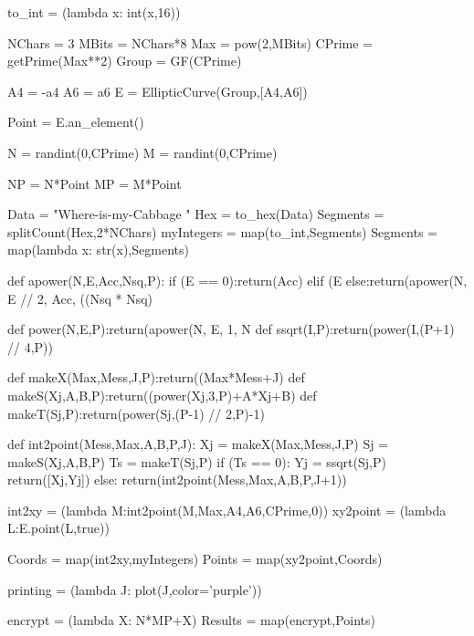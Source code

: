 \documentclass[a0,portrait]{a0poster}
\begin{document}
\begin{multicols}{2}
\begin{sagesilent}
  to_int = (lambda x: int(x,16))

\end{sagesilent}

\begin{sagesilent}
  NChars = 3
  MBits = NChars*8
  Max = pow(2,MBits)
  CPrime = getPrime(Max**2)
  Group = GF(CPrime)

  A4 = -a4
  A6 =  a6
  E = EllipticCurve(Group,[A4,A6])

  Point = E.an_element()

  N = randint(0,CPrime)
  M = randint(0,CPrime)

  NP = N*Point
  MP = M*Point

  Data = "Where-is-my-Cabbage  "
  Hex = to_hex(Data)
  Segments = splitCount(Hex,2*NChars)
  myIntegers = map(to_int,Segments)
  Segments = map(lambda x: str(x),Segments)
\end{sagesilent}

\begin{sagesilent}
def apower(N,E,Acc,Nsq,P):
    if (E == 0):return(Acc)
    elif (E %
    else:return(apower(N, E // 2, Acc, ((Nsq * Nsq) %
    
def power(N,E,P):return(apower(N, E, 1, N %
def ssqrt(I,P):return(power(I,(P+1) // 4,P))
\end{sagesilent}


\begin{sagesilent}
def makeX(Max,Mess,J,P):return((Max*Mess+J) %
def makeS(Xj,A,B,P):return((power(Xj,3,P)+A*Xj+B)%
def makeT(Sj,P):return(power(Sj,(P-1) // 2,P)-1)
  
def int2point(Mess,Max,A,B,P,J):
    Xj = makeX(Max,Mess,J,P)
    Sj = makeS(Xj,A,B,P)
    Ts = makeT(Sj,P)
    if (Ts == 0):
        Yj = ssqrt(Sj,P)
        return([Xj,Yj])
    else:
        return(int2point(Mess,Max,A,B,P,J+1))
\end{sagesilent}

\begin{sagesilent}
int2xy = (lambda M:int2point(M,Max,A4,A6,CPrime,0))
xy2point = (lambda L:E.point(L,true))

Coords = map(int2xy,myIntegers)
Points = map(xy2point,Coords)
\end{sagesilent}
\begin{sagesilent}
  printing = (lambda J: plot(J,color='purple'))

  encrypt  = (lambda X: N*MP+X)
  Results = map(encrypt,Points)


\end{sagesilent}
\end{multicols}
\end{document}
